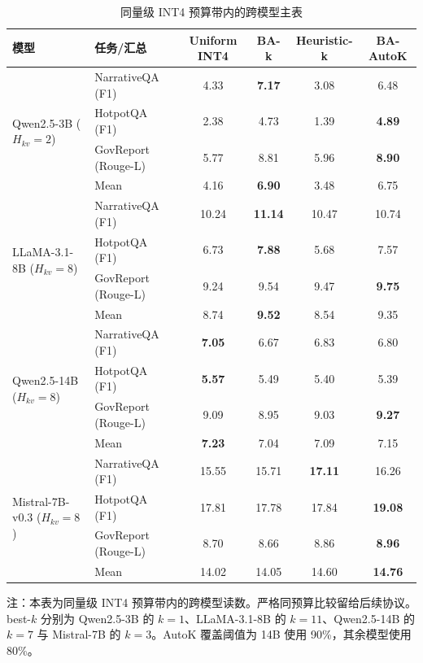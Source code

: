\begin{table}[H]
  \centering
  \caption{同量级 INT4 预算带内的跨模型主表}
  \label{tab:ch4-regime-main}
  \label{tab:t3-cross-model-main}
  {%
  \footnotesize
  \setlength{\tabcolsep}{4pt}
  \renewcommand{\arraystretch}{1.05}
  \begin{tabular}{llcccc}
    \toprule
    模型 & 任务/汇总 & Uniform INT4 & BA-k & Heuristic-k & BA-AutoK \\
    \midrule
    \multirow{4}{*}{Qwen2.5-3B ($H_{kv}=2$)}
      & NarrativeQA (F1)    & 4.33 & \textbf{7.17} & 3.08 & 6.48 \\
      & HotpotQA (F1)       & 2.38 & 4.73 & 1.39 & \textbf{4.89} \\
      & GovReport (Rouge-L) & 5.77 & 8.81 & 5.96 & \textbf{8.90} \\
      & Mean                & 4.16 & \textbf{6.90} & 3.48 & 6.75 \\
    \midrule
    \multirow{4}{*}{LLaMA-3.1-8B ($H_{kv}=8$)}
      & NarrativeQA (F1)    & 10.24 & \textbf{11.14} & 10.47 & 10.74 \\
      & HotpotQA (F1)       & 6.73  & \textbf{7.88}  & 5.68  & 7.57 \\
      & GovReport (Rouge-L) & 9.24  & 9.54 & 9.47 & \textbf{9.75} \\
      & Mean                & 8.74  & \textbf{9.52} & 8.54 & 9.35 \\
    \midrule
    \multirow{4}{*}{Qwen2.5-14B ($H_{kv}=8$)}
      & NarrativeQA (F1)    & \textbf{7.05} & 6.67 & 6.83 & 6.80 \\
      & HotpotQA (F1)       & \textbf{5.57} & 5.49 & 5.40 & 5.39 \\
      & GovReport (Rouge-L) & 9.09 & 8.95 & 9.03 & \textbf{9.27} \\
      & Mean                & \textbf{7.23} & 7.04 & 7.09 & 7.15 \\
    \midrule
    \multirow{4}{*}{Mistral-7B-v0.3 ($H_{kv}=8$)}
      & NarrativeQA (F1)    & 15.55 & 15.71 & \textbf{17.11} & 16.26 \\
      & HotpotQA (F1)       & 17.81 & 17.78 & 17.84 & \textbf{19.08} \\
      & GovReport (Rouge-L) & 8.70  & 8.66  & 8.86 & \textbf{8.96} \\
      & Mean                & 14.02 & 14.05 & 14.60 & \textbf{14.76} \\
    \bottomrule
  \end{tabular}

  \vspace{0.35em}
  \begin{minipage}{0.94\linewidth}
    \footnotesize
    注：本表为同量级 INT4 预算带内的跨模型读数。严格同预算比较留给后续协议。best-$k$ 分别为 Qwen2.5-3B 的 $k=1$、LLaMA-3.1-8B 的 $k=11$、Qwen2.5-14B 的 $k=7$ 与 Mistral-7B 的 $k=3$。AutoK 覆盖阈值为 14B 使用 90\%，其余模型使用 80\%。
  \end{minipage}
  }
\end{table}

